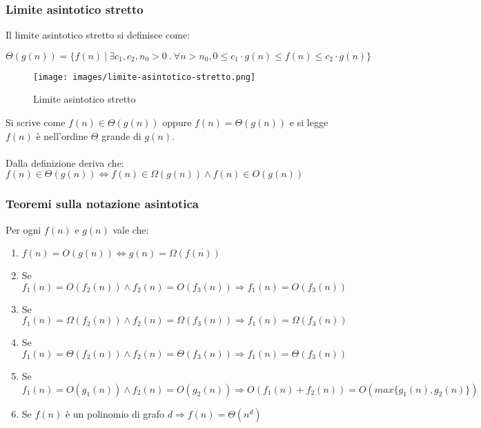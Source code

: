 \subsubsection{Limite asintotico stretto}
\begin{definition}
Il limite asintotico stretto si definisce come:
\begin{center}
    $\Theta(g(n)) = \{f(n) \: |\: \exists c_1, c_2, n_0 > 0 \: . \: \forall n > n_0, 0 \leq c_1 \cdot g(n) \leq f(n) \leq c_2 \cdot g(n) \}$
\end{center}
\end{definition}
\begin{wrapfigure}[5]{r}{8cm}
    \vspace{-10pt}
    \centering
    \texttt{[image: images/limite-asintotico-stretto.png]}
    \vspace{-5pt}
    \caption{Limite asintotico stretto}
\end{wrapfigure}
Si scrive come $f(n) \in \Theta(g(n))$ oppure $f(n) = \Theta(g(n))$ e si legge $f(n)$ è nell'ordine $\Theta$ grande di $g(n)$.\\\\
Dalla definizione deriva che:\\
$f(n) \in \Theta(g(n)) \Longleftrightarrow f(n) \in \Omega(g(n)) \land f(n) \in O(g(n))$\\


\subsubsection{Teoremi sulla notazione asintotica}
\begin{theorem}
Per ogni $f(n)$ e $g(n)$ vale che:
\begin{enumerate}
    \item $f(n) = O(g(n)) \Longleftrightarrow g(n) = \Omega(f(n))$
    \item Se $f_1(n) = O(f_2(n)) \land f_2(n) = O(f_3(n)) \Longrightarrow f_1(n) = O(f_3(n))$
    \item Se $f_1(n) = \Omega(f_2(n)) \land f_2(n) = \Omega(f_3(n)) \Longrightarrow f_1(n) = \Omega(f_3(n))$
    \item Se $f_1(n) = \Theta(f_2(n)) \land f_2(n) = \Theta(f_3(n)) \Longrightarrow f_1(n) = \Theta(f_3(n))$
    \item Se $f_1(n) = O(g_1(n)) \land f_2(n) = O(g_2(n)) \Longrightarrow O(f_1(n) + f_2(n)) = O(max\{g_1(n),g_2(n)\})$
    \item Se $f(n)$ è un polinomio di grafo $d \Longrightarrow f(n) = \Theta(n^d)$
\end{enumerate}
\end{theorem}

